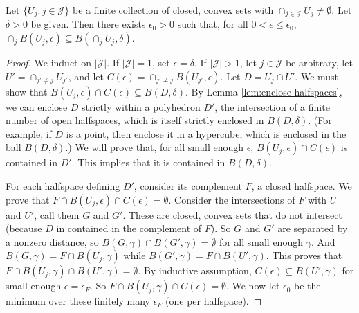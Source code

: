 \documentclass[twoside,11pt]{article}
\begin{document}
\begin{lemma} \label{lem:thick-nonempty}
  Let $\{U_j : j \in \mathcal{J}\}$ be a finite collection of closed, convex sets with $\cap_{j\in\mathcal{J}} U_j \neq \emptyset$.
  Let $\delta > 0$ be given.
  Then there exists  $\epsilon_0 > 0$ such that, for all $0 < \epsilon \leq \epsilon_0$, $\cap_j B(U_j,\epsilon) \subseteq B(\cap_j U_j, \delta)$.
\end{lemma}
\begin{proof}
  We induct on $|\mathcal{J}|$.
  If $|\mathcal{J}|=1$, set $\epsilon = \delta$.
  If $|\mathcal{J}|>1$, let $j\in\mathcal{J}$ be arbitrary, let $U' = \cap_{j'\neq j} U_{j'}$, and let $C(\epsilon) = \cap_{j' \neq j} B(U_{j'},\epsilon)$.
  Let $D = U_j \cap U'$.
  We must show that $B(U_j,\epsilon) \cap C(\epsilon) \subseteq B(D,\delta)$.
  By Lemma \ref{lem:enclose-halfspaces}, we can enclose $D$ strictly within a polyhedron $D'$, the intersection of a finite number of open halfspaces, which is itself strictly enclosed in $B(D,\delta)$.
  (For example, if $D$ is a point, then enclose it in a hypercube, which is enclosed in the ball $B(D,\delta)$.)
  We will prove that, for all small enough $\epsilon$, $B(U_j,\epsilon) \cap C(\epsilon)$ is contained in $D'$.
  This implies that it is contained in $B(D,\delta)$.

  For each halfspace defining $D'$, consider its complement $F$, a closed halfspace.
  We prove that $F \cap B(U_j,\epsilon) \cap C(\epsilon) = \emptyset$.
  Consider the intersections of $F$ with $U$ and $U'$, call them $G$ and $G'$.
  These are closed, convex sets that do not intersect (because $D$ in contained in the complement of $F$).
  So $G$ and $G'$ are separated by a nonzero distance, so $B(G,\gamma) \cap B(G',\gamma) = \emptyset$ for all small enough $\gamma$.
  And $B(G,\gamma) = F \cap B(U_j,\gamma)$ while $B(G',\gamma) = F \cap B(U',\gamma)$.
  This proves that $F \cap B(U_j,\gamma) \cap B(U',\gamma) = \emptyset$.
  By inductive assumption, $C(\epsilon) \subseteq B(U',\gamma)$ for small enough $\epsilon = \epsilon_F$.
  So $F \cap B(U_j,\gamma) \cap C(\epsilon) = \emptyset$.
  We now let $\epsilon_0$ be the minimum over these finitely many $\epsilon_F$ (one per halfspace).
\end{proof}
\end{document}
